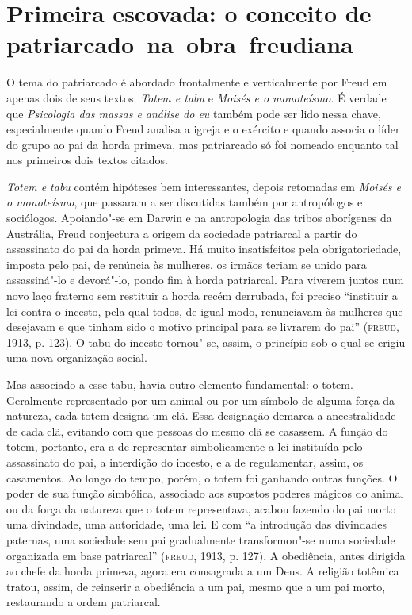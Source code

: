 \section{Primeira escovada: o conceito de patriarcado~na~obra~freudiana}

O tema do patriarcado é abordado frontalmente e verticalmente por Freud
em apenas dois de seus textos: \emph{Totem e tabu} e \emph{Moisés e o
monoteísmo}. É verdade que \emph{Psicologia das massas e análise do eu}
também pode ser lido nessa chave, especialmente quando Freud analisa a
igreja e o exército e quando associa o líder do grupo ao pai da horda
primeva, mas patriarcado só foi nomeado enquanto tal nos primeiros dois
textos citados.

\emph{Totem e tabu} contém hipóteses bem interessantes, depois retomadas
em \emph{Moisés e o monoteísmo}, que passaram a ser discutidas também
por antropólogos e sociólogos. Apoiando"-se em Darwin e na antropologia
das tribos aborígenes da Austrália, Freud conjectura a origem da
sociedade patriarcal a partir do assassinato do pai da horda primeva. Há
muito insatisfeitos pela obrigatoriedade, imposta pelo pai, de renúncia
às mulheres, os irmãos teriam se unido para assassiná"-lo e devorá"-lo,
pondo fim à horda patriarcal. Para viverem juntos num novo laço fraterno
sem restituir a horda recém derrubada, foi preciso ``instituir a lei
contra o incesto, pela qual todos, de igual modo, renunciavam às
mulheres que desejavam e que tinham sido o motivo principal para se
livrarem do pai'' (\textsc{freud}, 1913, p. 123). O tabu do incesto tornou"-se,
assim, o princípio sob o qual se erigiu uma nova organização social.

Mas associado a esse tabu, havia outro elemento fundamental: o totem.
Geralmente representado por um animal ou por um símbolo de alguma força
da natureza, cada totem designa um clã. Essa designação demarca a
ancestralidade de cada clã, evitando com que pessoas do mesmo clã se
casassem. A função do totem, portanto, era a de representar
simbolicamente a lei instituída pelo assassinato do pai, a interdição do
incesto, e a de regulamentar, assim, os casamentos. Ao longo do tempo,
porém, o totem foi ganhando outras funções. O poder de sua função
simbólica, associado aos supostos poderes mágicos do animal ou da força
da natureza que o totem representava, acabou fazendo do pai morto uma
divindade, uma autoridade, uma lei. E com ``a introdução das divindades
paternas, uma sociedade sem pai gradualmente transformou"-se numa
sociedade organizada em base patriarcal'' (\textsc{freud}, 1913, p. 127). A
obediência, antes dirigida ao chefe da horda primeva, agora era
consagrada a um Deus. A religião totêmica tratou, assim, de reinserir a
obediência a um pai, mesmo que a um pai morto, restaurando a ordem
patriarcal.

